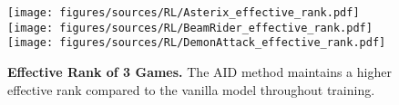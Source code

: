 

\begin{figure*}[h]
    \centering
    \texttt{[image: figures/sources/RL/Asterix\_effective\_rank.pdf]}
    \texttt{[image: figures/sources/RL/BeamRider\_effective\_rank.pdf]}
    \texttt{[image: figures/sources/RL/DemonAttack\_effective\_rank.pdf]}
    \caption{\textbf{Effective Rank of 3 Games.} The AID method maintains a higher effective rank compared to the vanilla model throughout training.}
    
    \label{exp_RL_feature_rank}
\end{figure*}


